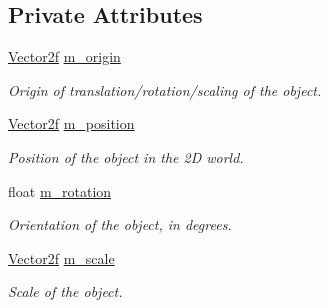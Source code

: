 \subsection*{Private Attributes}
\begin{DoxyCompactItemize}
\item 
\mbox{\label{classsf_1_1_transformable_ad52a72593cb43a30a0cac33737a3a60c}} 
\mbox{\hyperlink{classsf_1_1_vector2}{Vector2f}} \mbox{\hyperlink{classsf_1_1_transformable_ad52a72593cb43a30a0cac33737a3a60c}{m\+\_\+origin}}
\begin{DoxyCompactList}\small\item\em Origin of translation/rotation/scaling of the object. \end{DoxyCompactList}\item 
\mbox{\label{classsf_1_1_transformable_a7081bf508f612cb63e9ce3b149758217}} 
\mbox{\hyperlink{classsf_1_1_vector2}{Vector2f}} \mbox{\hyperlink{classsf_1_1_transformable_a7081bf508f612cb63e9ce3b149758217}{m\+\_\+position}}
\begin{DoxyCompactList}\small\item\em Position of the object in the 2D world. \end{DoxyCompactList}\item 
\mbox{\label{classsf_1_1_transformable_a206c593d926ee30a3c79520c2fae448b}} 
float \mbox{\hyperlink{classsf_1_1_transformable_a206c593d926ee30a3c79520c2fae448b}{m\+\_\+rotation}}
\begin{DoxyCompactList}\small\item\em Orientation of the object, in degrees. \end{DoxyCompactList}\item 
\mbox{\label{classsf_1_1_transformable_adf2c5e463aefb41c6d43a140c0ad151f}} 
\mbox{\hyperlink{classsf_1_1_vector2}{Vector2f}} \mbox{\hyperlink{classsf_1_1_transformable_adf2c5e463aefb41c6d43a140c0ad151f}{m\+\_\+scale}}
\begin{DoxyCompactList}\small\item\em Scale of the object. \end{DoxyCompactList}\item 
\mbox{\label{classsf_1_1_transformable_ae7451ed9c4d1065fc050ce3e5ad7b34c}} 

\end{DoxyCompactItemize}
